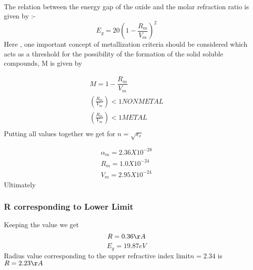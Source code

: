\documentclass[journal]{IEEEtran}
\begin{document}
\

The relation between the energy gap of the oxide and the molar refraction  ratio is given by :-
\begin{equation}
E_g = 20(1- \dfrac{R_m}{V_m})^2
\end{equation}
Here , one important concept of metallization criteria should be considered which acts as a threshold for the possibility of the formation of the solid soluble compounds, M is given by

\begin{align}
M = 1 - \dfrac{R_m}{V_m}                \\
(\frac{R_m}{V_m}) < 1   NON METAL        \\
(\frac{R_m}{V_m}) < 1      METAL          \\
\end{align}
Putting all values together we get for $n = \sqrt{\epsilon_r}$

\begin{align*}
\alpha_m = 2.36 X 10^{-28} \\
R_m =  1.0 X 10^{-24}      \\
V_m = 2.95 X 10^{-24}        
\end{align*}
Ultimately
\subsubsection{R corresponding to Lower Limit}
Keeping the value we get 
\begin{equation}
R = 0.36 \AA
\end{equation}
\begin{equation}
E_g = 19.87 eV
\end{equation}
Radius value corresponding to the upper refractive index limit$ n=2.34$ is $ R = 2.23 \AA $
\end{document}
